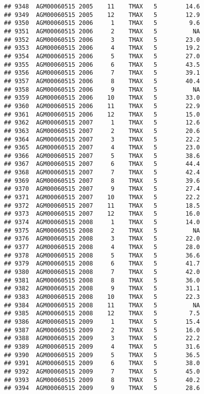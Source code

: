 \documentclass{article}\usepackage[]{graphicx}\usepackage[]{color}
\makeatletter
\newenvironment{kframe}{%
 \def\at@end@of@kframe{}%
 \ifinner\ifhmode%
  \def\at@end@of@kframe{\end{minipage}}%
  \begin{minipage}{\columnwidth}%
 \fi\fi%
 \def\FrameCommand##1{\hskip\@totalleftmargin \hskip-\fboxsep
 \colorbox{shadecolor}{##1}\hskip-\fboxsep
     \hskip-\linewidth \hskip-\@totalleftmargin \hskip\columnwidth}%
 \MakeFramed {\advance\hsize-\width
   \@totalleftmargin\z@ \linewidth\hsize
   \@setminipage}}%
 {\par\unskip\endMakeFramed%
 \at@end@of@kframe}
\newenvironment{knitrout}{}{} %
\makeatother
\begin{document}
\begin{knitrout}
\begin{kframe}
\begin{verbatim}
## 9348  AGM00060515 2005    11    TMAX   5        14.6
## 9349  AGM00060515 2005    12    TMAX   5        12.9
## 9350  AGM00060515 2006     1    TMAX   5         9.6
## 9351  AGM00060515 2006     2    TMAX   5          NA
## 9352  AGM00060515 2006     3    TMAX   5        23.0
## 9353  AGM00060515 2006     4    TMAX   5        19.2
## 9354  AGM00060515 2006     5    TMAX   5        27.0
## 9355  AGM00060515 2006     6    TMAX   5        43.5
## 9356  AGM00060515 2006     7    TMAX   5        39.1
## 9357  AGM00060515 2006     8    TMAX   5        40.4
## 9358  AGM00060515 2006     9    TMAX   5          NA
## 9359  AGM00060515 2006    10    TMAX   5        33.0
## 9360  AGM00060515 2006    11    TMAX   5        22.9
## 9361  AGM00060515 2006    12    TMAX   5        15.0
## 9362  AGM00060515 2007     1    TMAX   5        12.6
## 9363  AGM00060515 2007     2    TMAX   5        20.6
## 9364  AGM00060515 2007     3    TMAX   5        22.2
## 9365  AGM00060515 2007     4    TMAX   5        23.0
## 9366  AGM00060515 2007     5    TMAX   5        38.6
## 9367  AGM00060515 2007     6    TMAX   5        44.4
## 9368  AGM00060515 2007     7    TMAX   5        42.4
## 9369  AGM00060515 2007     8    TMAX   5        39.6
## 9370  AGM00060515 2007     9    TMAX   5        27.4
## 9371  AGM00060515 2007    10    TMAX   5        22.2
## 9372  AGM00060515 2007    11    TMAX   5        18.5
## 9373  AGM00060515 2007    12    TMAX   5        16.0
## 9374  AGM00060515 2008     1    TMAX   5        14.0
## 9375  AGM00060515 2008     2    TMAX   5          NA
## 9376  AGM00060515 2008     3    TMAX   5        22.0
## 9377  AGM00060515 2008     4    TMAX   5        28.0
## 9378  AGM00060515 2008     5    TMAX   5        36.6
## 9379  AGM00060515 2008     6    TMAX   5        41.7
## 9380  AGM00060515 2008     7    TMAX   5        42.0
## 9381  AGM00060515 2008     8    TMAX   5        36.0
## 9382  AGM00060515 2008     9    TMAX   5        31.1
## 9383  AGM00060515 2008    10    TMAX   5        22.3
## 9384  AGM00060515 2008    11    TMAX   5          NA
## 9385  AGM00060515 2008    12    TMAX   5         7.5
## 9386  AGM00060515 2009     1    TMAX   5        15.4
## 9387  AGM00060515 2009     2    TMAX   5        16.0
## 9388  AGM00060515 2009     3    TMAX   5        22.2
## 9389  AGM00060515 2009     4    TMAX   5        31.6
## 9390  AGM00060515 2009     5    TMAX   5        36.5
## 9391  AGM00060515 2009     6    TMAX   5        38.0
## 9392  AGM00060515 2009     7    TMAX   5        45.0
## 9393  AGM00060515 2009     8    TMAX   5        40.2
## 9394  AGM00060515 2009     9    TMAX   5        28.6

\end{verbatim}
\end{kframe}
\end{knitrout}
\end{document}
